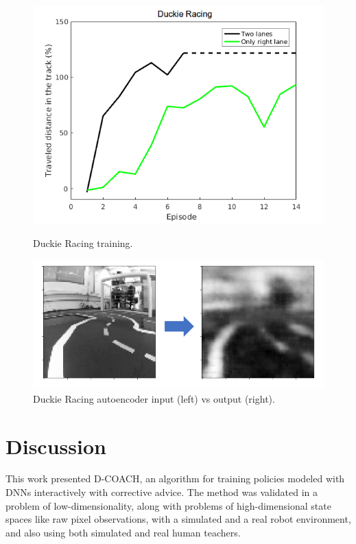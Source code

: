 \begin{figure}[H]
    \centering
    \begin{minipage}{.5\textwidth}
    \vspace{-0.2cm}
    \includegraphics[width=1.0\linewidth]{imagenes/cap3/racing_duckie_results.png}
    \vspace{-0.2cm}
    \caption{Duckie Racing training.}
    \label{fig:racing_duckie_results}
    \end{minipage}%
    \begin{minipage}{.5\textwidth}
    \centering
    \includegraphics[width=1.0\linewidth]{imagenes/cap3/AE_duckie2.png}
    \vspace{-0.2cm}
    \caption{Duckie Racing autoencoder input (left) vs output (right).}
    \label{fig:AE_duckie}
    \end{minipage}
\end{figure}

\section{Discussion}
This work presented D-COACH, an algorithm for training policies modeled with DNNs interactively with corrective advice. The method was validated in a problem of low-dimensionality, along with problems of high-dimensional state spaces like raw pixel observations, with a simulated and a real robot environment, and also using both simulated and real human teachers. 

